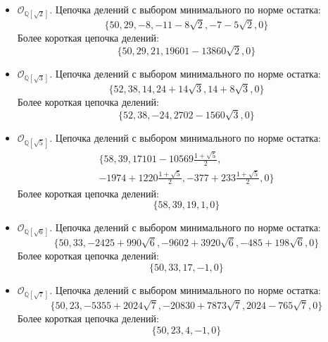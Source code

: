 \documentclass[_00_dissertation.tex]{subfiles}
\begin{document}
\begin{itemize}
    \item $\mathcal{O}_{\mathbb{Q}[\sqrt{2}]}$.
    Цепочка делений с выбором минимального по норме остатка:
    \begin{equation*}
        \{50, 29, -8, -11-8\sqrt{2}, -7-5\sqrt{2}, 0\}
    \end{equation*}
    Более короткая цепочка делений:
    \begin{equation*}
        \{50, 29, 21, 19601-13860\sqrt{2}, 0\}
    \end{equation*}

    \item $\mathcal{O}_{\mathbb{Q}[\sqrt{3}]}$.
    Цепочка делений с выбором минимального по норме остатка:
    \begin{equation*}
        \{52, 38, 14, 24+14\sqrt{3}, 14+8\sqrt{3}, 0\}
    \end{equation*}
    Более короткая цепочка делений:
    \begin{equation*}
        \{52, 38, -24, 2702-1560\sqrt{3}, 0\}
    \end{equation*}

    \item $\mathcal{O}_{\mathbb{Q}[\sqrt{5}]}$.
    Цепочка делений с выбором минимального по норме остатка:
    \begin{multline*}
        \{58, 39, 17101-10569\frac{1+\sqrt{5}}{2},\\
        -1974+1220\frac{1+\sqrt{5}}{2}, -377+233\frac{1+\sqrt{5}}{2}, 0\}
    \end{multline*}
    Более короткая цепочка делений:
    \begin{equation*}
        \{58, 39, 19, 1, 0\}
    \end{equation*}

    \item $\mathcal{O}_{\mathbb{Q}[\sqrt{6}]}$.
    Цепочка делений с выбором минимального по норме остатка:
    \begin{equation*}
        \{50, 33, -2425+990\sqrt{6}, -9602+3920\sqrt{6}, -485+198\sqrt{6}, 0\}
    \end{equation*}
    Более короткая цепочка делений:
    \begin{equation*}
        \{50, 33, 17, -1, 0\}
    \end{equation*}

    \item $\mathcal{O}_{\mathbb{Q}[\sqrt{7}]}$.
    Цепочка делений с выбором минимального по норме остатка:
    \begin{equation*}
        \{50, 23, -5355+2024\sqrt{7}, -20830+7873\sqrt{7}, 2024-765\sqrt{7}, 0\}
    \end{equation*}
    Более короткая цепочка делений:
    \begin{equation*}
        \{50, 23, 4, -1, 0\}
    \end{equation*}


\end{itemize}
\end{document}

